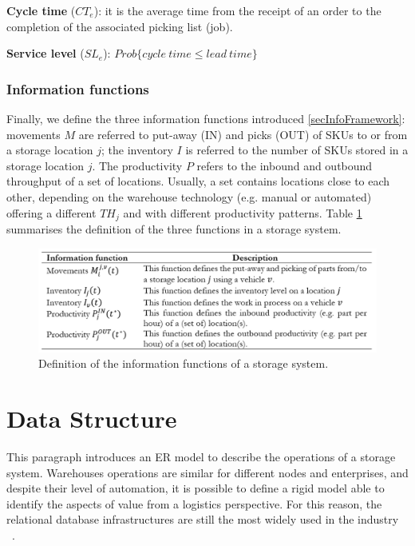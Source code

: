 \textbf{Cycle time} ($CT_e$): it is the average time from the receipt of an order to the completion of the associated picking list (job). \par

\textbf{Service level} ($SL_e$): $Prob\{cycle\ time\le lead\ time\}$

\subsubsection{Information functions}

Finally, we define the three information functions introduced \ref{secInfoFramework}: movements $M$ are referred to put-away (IN) and picks (OUT) of SKUs to or from a storage location $j$; the inventory $I$ is referred to the number of SKUs stored in a storage location $j$. The productivity $P$ refers to the inbound and outbound throughput of a set of locations. Usually, a set contains locations close to each other, depending on the warehouse technology (e.g. manual or automated) offering a different $TH_j$ and with different productivity patterns. Table \ref{tab_information_function_wh} summarises the definition of the three functions in a storage system.

\begin{figure}[hbt!]
\centering
\includegraphics[width=1\textwidth]{SectionWarehouses/diagnsticModels_figures/tab_information_function_wh.png}
\captionsetup{type=table}
\caption{Definition of the information functions of a storage system.}
\label{tab_information_function_wh}
\end{figure}


\section{Data Structure}
This paragraph introduces an ER model to describe the operations of a storage system. Warehouses operations are similar for different nodes and enterprises, and despite their level of automation, it is possible to define a rigid model able to identify the aspects of value from a logistics perspective. For this reason, the relational database infrastructures are still the most widely used in the industry ~\cite{Accorsi2014}. 

